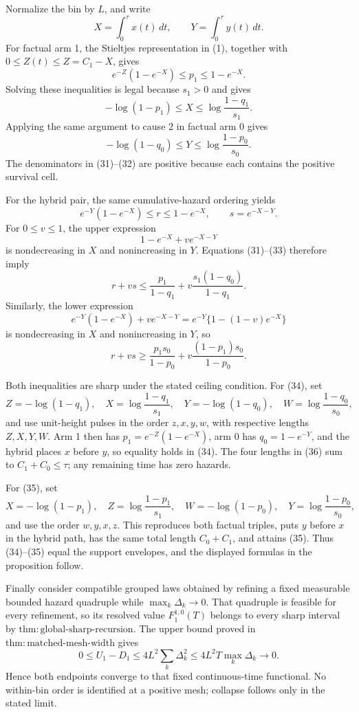 Normalize the bin by \(L\), and write
\[
 X=\int_0^\tau x(t)\,dt,\quad\quad Y=\int_0^\tau y(t)\,dt.
\]
For factual arm 1, the Stieltjes representation in (1), together with \(0\le Z(t)\le Z=C_1-X\), gives
\[
 e^{-Z}(1-e^{-X})\le p_1\le1-e^{-X}.
\]
Solving these inequalities is legal because \(s_1>0\) and gives
\[
 -\log(1-p_1)\le X\le\log\frac{1-q_1}{s_1}.                \tag{31}
\]
Applying the same argument to cause 2 in factual arm 0 gives
\[
 -\log(1-q_0)\le Y\le\log\frac{1-p_0}{s_0}.                \tag{32}
\]
The denominators in (31)--(32) are positive because each contains the positive survival cell.

For the hybrid pair, the same cumulative-hazard ordering yields
\[
 e^{-Y}(1-e^{-X})\le r\le1-e^{-X},
 \quad\quad s=e^{-X-Y}.                                         \tag{33}
\]
For \(0\le v\le1\), the upper expression
\[
 1-e^{-X}+ve^{-X-Y}
\]
is nondecreasing in \(X\) and nonincreasing in \(Y\).  Equations (31)--(33) therefore imply
\[
 r+vs\le \frac{p_1}{1-q_1}
          +v\frac{s_1(1-q_0)}{1-q_1}.                       \tag{34}
\]
Similarly, the lower expression
\[
 e^{-Y}(1-e^{-X})+ve^{-X-Y}
 =e^{-Y}\{1-(1-v)e^{-X}\}
\]
is nondecreasing in \(X\) and nonincreasing in \(Y\), so
\[
 r+vs\ge \frac{p_1s_0}{1-p_0}
          +v\frac{(1-p_1)s_0}{1-p_0}.                       \tag{35}
\]

Both inequalities are sharp under the stated ceiling condition.  For (34), set
\[
 Z=-\log(1-q_1),\quad X=\log\frac{1-q_1}{s_1},\quad
 Y=-\log(1-q_0),\quad W=\log\frac{1-q_0}{s_0},              \tag{36}
\]
and use unit-height pulses in the order \(z,x,y,w\), with respective lengths \(Z,X,Y,W\).  Arm 1 then has \(p_1=e^{-Z}(1-e^{-X})\), arm 0 has \(q_0=1-e^{-Y}\), and the hybrid places \(x\) before \(y\), so equality holds in (34).  The four lengths in (36) sum to \(C_1+C_0\le\tau\); any remaining time has zero hazards.

For (35), set
\[
 X=-\log(1-p_1),\quad Z=\log\frac{1-p_1}{s_1},\quad
 W=-\log(1-p_0),\quad Y=\log\frac{1-p_0}{s_0},              \tag{37}
\]
and use the order \(w,y,x,z\).  This reproduces both factual triples, puts \(y\) before \(x\) in the hybrid path, has the same total length \(C_0+C_1\), and attains (35).  Thus (34)--(35) equal the support envelopes, and the displayed formulas in the proposition follow.

Finally consider compatible grouped laws obtained by refining a fixed measurable bounded hazard quadruple while \(\max_k\Delta_k\to0\).  That quadruple is feasible for every refinement, so its resolved value \(F_1^{1,0}(T)\) belongs to every sharp interval by \(\mathrm{thm{:}global\text{-}sharp\text{-}recursion}\).  The upper bound proved in \(\mathrm{thm{:}matched\text{-}mesh\text{-}width}\) gives
\[
 0\le U_1-D_1\le4L^2\sum_k\Delta_k^2
 \le4L^2T\max_k\Delta_k\longrightarrow0.                 \tag{38}
\]
Hence both endpoints converge to that fixed continuous-time functional.  No within-bin order is identified at a positive mesh; collapse follows only in the stated limit.

